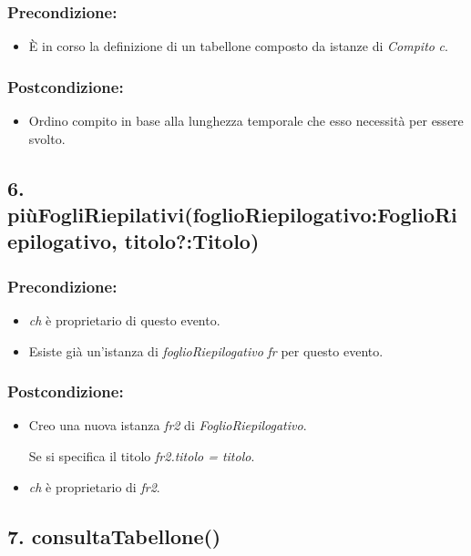 \subsubsection*{Precondizione:}
\begin{itemize}
    \item È in corso la definizione di un tabellone composto da istanze di \textit{Compito} \textit{c}.
\end{itemize}

\subsubsection*{Postcondizione:}
\begin{itemize}
    \item Ordino compito in base alla lunghezza temporale che esso necessità per essere svolto.
\end{itemize}

\subsection*{6. piùFogliRiepilativi(foglioRiepilogativo:FoglioRiepilogativo, titolo?:Titolo)}

\subsubsection*{Precondizione:}
\begin{itemize}
    \item \textit{ch} è proprietario di questo evento.
    \item Esiste già un'istanza di \textit{foglioRiepilogativo} \textit{fr} per questo evento.
\end{itemize}

\subsubsection*{Postcondizione:}
\begin{itemize}
    \item Creo una nuova istanza \textit{fr2} di \textit{FoglioRiepilogativo}.
    \item [Se si specifica il titolo] \textit{fr2.titolo = titolo}.
    \item \textit{ch} è proprietario di \textit{fr2}.
\end{itemize}

\subsection*{7. consultaTabellone()}

